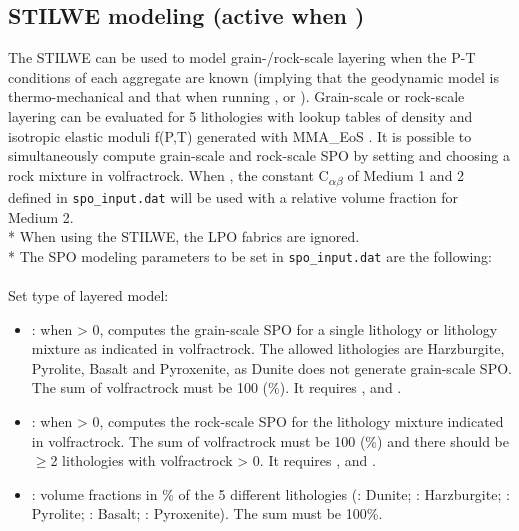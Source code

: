 \subsection{STILWE modeling (active when )}
The STILWE can be used to model grain-/rock-scale layering when the P-T conditions of each aggregate are known (implying that the geodynamic model is thermo-mechanical and that  when running \drexmtitle, or \drexstitle). Grain-scale or rock-scale layering can be evaluated for 5 lithologies with lookup tables of density and isotropic elastic moduli f(P,T) generated with MMA\_EoS \citep{chust2017jgr}. It is possible to simultaneously compute grain-scale and rock-scale SPO by setting  and choosing a rock mixture in volfractrock.
When , the constant C\textsubscript{$\alpha\beta$} of Medium 1 and 2 defined in \texttt{spo\_input.dat} will be used with a relative volume fraction  for Medium 2. \\*
When using the STILWE, the LPO fabrics are ignored.\\*
The SPO modeling parameters to be set in \texttt{spo\_input.dat} are the following:\\
\\
Set type of layered model:
\begin{itemize}
    \item {}: when > 0, computes the grain-scale SPO for a single lithology or lithology mixture as indicated in volfractrock. The allowed lithologies are Harzburgite, Pyrolite, Basalt and Pyroxenite, as Dunite does not generate grain-scale SPO.  The sum of volfractrock must be 100 (\%). It requires ,  and .
    \item {}: when > 0, computes the rock-scale SPO for the lithology mixture indicated in volfractrock. The sum of volfractrock must be 100 (\%) and there should be $\geq$2 lithologies with volfractrock > 0. It requires ,  and .
    \item {}: volume fractions in \% of the 5 different lithologies (: Dunite; : Harzburgite; : Pyrolite; : Basalt; : Pyroxenite). The sum must be 100\%.
\end{itemize}

